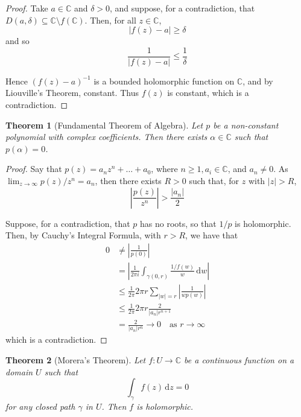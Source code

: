 \documentclass[10pt,fleqn]{article}
\newcommand{\diff}{\,\mathrm{d}}
\newcommand{\comps}{\mathbb{C}}
\theoremstyle{definition} \newtheorem{defn}{Definition}[section]
\theoremstyle{plain}      \newtheorem{thm}[defn]{Theorem}
\theoremstyle{definition} \newtheorem{prop}[defn]{Proposition}
\theoremstyle{plain}      \newtheorem{lem}[defn]{Lemma}
\theoremstyle{definition} \newtheorem{cor}[defn]{Corollary}
\theoremstyle{definition} \newtheorem{ex}[defn]{Example}
\theoremstyle{definition} \newtheorem{rem}[defn]{Remark}
\begin{document}
\begin{proof}
    Take $a\in\comps$ and $\delta>0$, and suppose, for a contradiction, that $D(a,\delta)\subseteq\comps\setminus f(\comps)$.
    Then, for all $z\in\comps$,
    \[
        |f(z)-a|\geq\delta
    \]
    and so
    \[
        \frac{1}{|f(z)-a|}\leq\frac{1}{\delta}
    \]

    Hence $(f(z)-a)^{-1}$ is a bounded holomorphic function on $\comps$, and by Liouville's Theorem, constant.
    Thus $f(z)$ is constant, which is a contradiction.
\end{proof}

\begin{thm}[Fundamental Theorem of Algebra]
    Let $p$ be a non-constant polynomial with complex coefficients.
    Then there exists $\alpha\in\comps$ such that $p(\alpha)=0$.
\end{thm}

\begin{proof}
    Say that $p(z)=a_nz^n+\ldots+a_0$, where $n\geq1,a_i\in\comps$, and $a_n\neq0$.
    As $\lim_{z\to\infty}p(z)/z^n=a_n$, then there exists $R>0$ such that, for $z$ with $|z|>R$,
    \[
        \left|\frac{p(z)}{z^n}\right|>\frac{|a_n|}{2}
    \]

    Suppose, for a contradiction, that $p$ has no roots, so that $1/p$ is holomorphic.
    Then, by Cauchy's Integral Formula, with $r>R$, we have that
    \begin{align*}
        0
        &\neq
        \left|\frac{1}{p(0)}\right|\\
        &=
        \left|\frac{1}{2\pi i}\int_{\gamma(0,r)}\frac{1/f(w)}{w}\diff w\right|\\
        &\leq
        \frac{1}{2\pi}2\pi r\sum_{|w|=r}\left|\frac{1}{wp(w)}\right|\\
        &\leq
        \frac{1}{2\pi}2\pi r\frac{2}{|a_n|r^{n+1}}\\
        &=
        \frac{2}{|a_n|r^n}\to0\quad\text{as }r\to\infty
    \end{align*}
    which is a contradiction.
\end{proof}

\begin{thm}[Morera's Theorem]
    Let $f:U\to\comps$ be a continuous function on a domain $U$ such that
    \[
        \int_{\gamma} f(z)\diff z=0
    \]
    for any closed path $\gamma$ in $U$.
    Then $f$ is holomorphic.
\end{thm}
\end{document}
